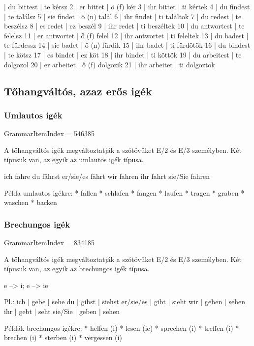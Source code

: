 \documentclass{article}
\newenvironment{desc}{\verbatim}{\endverbatim}
\newenvironment{exmp}{\verbatim}{\endverbatim}
\begin{document}
\begin{exmp}
1 | du bittest | te kérsz
2 | er bittet | ö (f) kér
3 | ihr bittet | ti kértek
4 | du findest | te találsz
5 | sie findet | ö (n) talál
6 | ihr findet | ti találtok
7 | du redest | te beszélsz
8 | es redet | ez beszél
9 | ihr redet | ti beszéltek
10 | du antwortest | te felelsz
11 | er antwortet | ő (f) felel
12 | ihr antwortet | ti feleltek
13 | du badest | te fürdessz
14 | sie badet | ő (n) fürdik
15 | ihr badet | ti fürdötök
16 | du bindest | te kötsz
17 | es bindet | ez köt
18 | ihr bindet | ti köttök
19 | du arbeitest | te dolgozol
20 | er arbeitet | ő (f) dolgozik
21 | ihr arbeitet | ti dolgoztok
\end{exmp}

\subsection{Tőhangváltós, azaz erős igék}

\subsubsection{Umlautos igék}

GrammarItemIndex = 546385

\begin{desc}
A tőhangváltós igék megváltoztatják a szótövüket E/2 és E/3 személyben. Két típusuk van, az egyik az umlautos igék típusa.

ich fahre 
du fährst 
er/sie/es fährt 
wir fahren 
ihr fahrt 
sie/Sie fahren 

Példa umlautos igékre:
* fallen
* schlafen
* fangen
* laufen
* tragen
* graben
* waschen
* backen
\end{desc}

\begin{exmp}
\end{exmp}

\subsubsection{Brechungos igék}

GrammarItemIndex = 834185

\begin{desc}
A tőhangváltós igék megváltoztatják a szótövüket E/2 és E/3 személyben. Két típusuk van, az egyik az brechungos igék típusa.

e --> i; e --> ie

Pl.:
ich       | gebe  | sehe 
du        | gibst | siehst
er/sie/es | gibt  | sieht 
wir       | geben | sehen 
ihr       | gebt  | seht 
sie/Sie   | geben | sehen 

Példák brechungos igékre:
* helfen (i)
* lesen (ie)
* sprechen (i)
* treffen (i)
* brechen (i)
* sterben (i)
* vergessen (i)
\end{desc}
\end{document}
